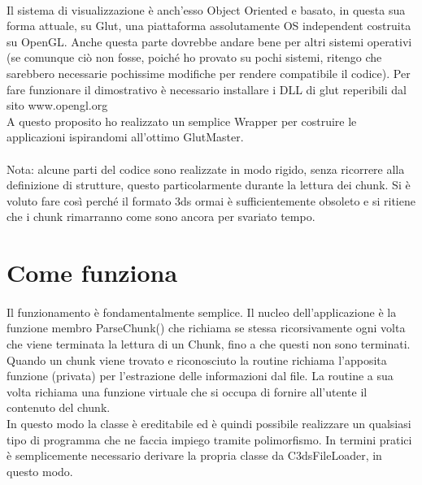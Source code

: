 \documentclass[11pt,a4paper]{article}
\begin{document}
\paragraph*{}
Il sistema di visualizzazione \`e anch'esso Object Oriented e basato, in questa sua forma attuale, su Glut, una piattaforma assolutamente OS independent costruita su OpenGL. Anche questa parte dovrebbe andare bene per altri sistemi operativi (se comunque ci\`o non fosse, poich\'e ho provato su pochi sistemi, ritengo che sarebbero necessarie pochissime modifiche per rendere compatibile il codice). Per fare funzionare il dimostrativo \`e necessario installare i DLL di glut reperibili dal sito www.opengl.org\\
A questo proposito ho realizzato un semplice Wrapper per costruire le applicazioni ispirandomi all'ottimo GlutMaster.

\paragraph*{}
Nota: alcune parti del codice sono realizzate in modo rigido, senza ricorrere alla definizione di strutture, questo particolarmente durante la lettura dei chunk. Si \`e voluto fare cos\`i perch\'e il formato 3ds ormai \`e sufficientemente obsoleto e si ritiene che i chunk rimarranno come sono ancora per svariato tempo.

\section*{Come funziona}

\paragraph*{}
Il funzionamento \`e fondamentalmente semplice. Il nucleo dell'applicazione \`e la funzione membro ParseChunk() che richiama se stessa ricorsivamente ogni volta che viene terminata la lettura di un Chunk, fino a che questi non sono terminati. Quando un chunk viene trovato e riconosciuto la routine richiama l'apposita funzione (privata) per l'estrazione delle informazioni dal file. La routine a sua volta richiama una funzione virtuale che si occupa di fornire all'utente il contenuto del chunk.\\
In questo modo la classe \`e ereditabile ed \`e quindi possibile realizzare un qualsiasi tipo di programma che ne faccia impiego tramite polimorfismo. In termini pratici \`e semplicemente necessario derivare la propria classe da C3dsFileLoader, in questo modo.
\end{document}
